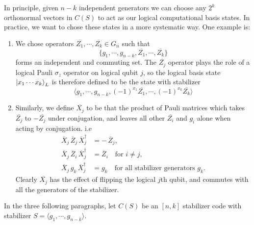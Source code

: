 \documentclass[11pt,a4paper]{article}
\theoremstyle{definition}
\theoremstyle{plain}
\theoremstyle{remark}
\begin{document}
In principle, given $n-k$  independent generators we can choose any $2^k$ orthonormal vectors in $C(S)$ to act 
as our logical computational basis states. In practice, we want to chose these states in a more systematic way. One example 
is: 
\begin{enumerate}
  \item We chose operators $\overline{Z_1}, \cdots, \overline{Z_k} \in G_n$ such that
  $$\{g_1, \cdots, g_{n-k}, \overline{Z_1}, \cdots, \overline{Z_k} \}$$ 
  forms an independent and commuting set. The $\overline{Z_j}$ operator plays the role of a logical Pauli $\sigma_z$ operator on 
  logical qubit $j$, so the logical basis state $\ket{x_1 \cdots x_k}_L$ is therefore defined to be the state with stabilizer 
  $$\langle g_1, \cdots, g_{n-k}, (-1)^{x_1}\overline{Z_1}, \cdots, (-1)^{x_k} \overline{Z_k}\rangle$$ 

  \item Similarly, we define $\overline{X_j}$ to be that the product of Pauli matrices which takes $\overline{Z_j}$ to 
  $- \overline{Z_j}$ under conjugation, and leaves all other $\overline{Z_i}$ and $g_i$ alone when acting by conjugation. i.e 
    \[
  \begin{aligned}
  \overline X_j \,\overline Z_j \,\overline X_j^\dagger &= -\,\overline Z_j,\\
  \overline X_j \,\overline Z_i \,\overline X_j^\dagger &= \overline Z_i
    \quad\text{for }i\neq j,\\
  \overline X_j \,g_k\,\overline X_j^\dagger &= g_k
    \quad\text{for all stabilizer generators }g_k.
  \end{aligned}
  \]
  Clearly $\overline{X_j}$ has the effect of flipping the logical $j$th qubit, and commutes with all the generators of the 
  stabilizer. 
\end{enumerate}

In the three following paragraphs, let $C(S)$ be an $[n,k]$ stabilizer code with stabilizer $S = \langle g_1, \cdots, g_{n-k}\rangle$. 
\end{document}
